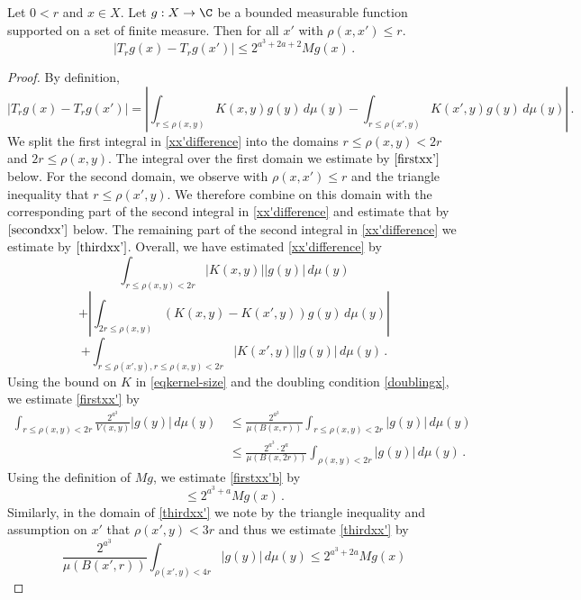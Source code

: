 \begin{lemma}
\label{estimate-x-shift}
\leanok
{}
Let $0<r$ and  $x\in X$. Let $g:X\to\C$ be a bounded measurable function supported on a set of finite measure.
Then for all $x'$ with $\rho(x,x')\le r$.
\begin{equation*}
\left| T_r g(x) - T_r g(x') \right|
\le 2^{a^3 + 2a + 2} Mg(x)\, .
\end{equation*}
\end{lemma}
\begin{proof}
\leanok
By definition,
\begin{equation}
\label{xx'difference}
\left| T_r g(x) - T_r g(x') \right|
=\left|\int_{r\le\rho(x,y)} K(x,y) g(y) \,d\mu(y)
-\int_{r\le\rho(x',y)}
K(x',y) g(y)\, d\mu(y)
\right| \, .
\end{equation}
We split the first integral in \eqref{xx'difference}
into the domains $r\le\rho(x,y)<2r$
and $2r\le\rho(x,y)$. The integral over the first domain we estimate
by $\eqref{firstxx'}$ below.
For the second domain, we
observe with $\rho(x,x')\le r$ and the triangle inequality that $r\le\rho(x',y)$. We therefore combine on this domain with the
corresponding part of the second integral in \eqref{xx'difference} and estimate that by $\eqref{secondxx'}$
below. The remaining part of the second integral in
\eqref{xx'difference} we estimate by $\eqref{thirdxx'}$.
Overall, we have estimated \eqref{xx'difference} by
\begin{equation}
\label{firstxx'}
\int_{r\le\rho(x,y)< 2r} |K(x,y)| |g(y)| \,d\mu(y)
\end{equation}
\begin{equation}
\label{secondxx'}
  +  \left|\int_{2r\le\rho(x,y)} (K(x,y)-K(x',y)) g(y) \,d\mu(y)
\right|
\end{equation}
\begin{equation}
\label{thirdxx'}
  +\int_{r\le\rho(x',y), r\le\rho(x,y)<2r}
|K(x',y)| |g(y)|\, d\mu(y)\,.
\end{equation}
Using the bound on $K$ in \eqref{eqkernel-size} and the doubling condition \eqref{doublingx}, we estimate \eqref{firstxx'} by
\begin{align}
 \int_{r\le\rho(x,y)<2r} \frac{2^{a^3}}{V(x,y)} |g(y)| \,d\mu(y)\,
&\le
\frac{2^{a^3}}{\mu(B(x,r))} \int_{r\le\rho(x,y)<2r}
|g(y)| \, d\mu(y)\, \\
\label{firstxx'b}
&\le
\frac{2^{a^3} \cdot 2^a}{\mu(B(x,2r))} \int_{\rho(x,y)<2r}
|g(y)| \, d\mu(y)\,
.
\end{align}
Using the definition of $Mg$, we estimate
\eqref{firstxx'b} by
\begin{equation}
\label{firstxx'c}
 \le 2^{a^3 + a} {Mg(x)}\, .
\end{equation}
Similarly, in the domain of \eqref{thirdxx'}
we note by the triangle inequality
and assumption on $x'$ that $\rho(x',y)<3r$ and thus we estimate
\eqref{thirdxx'}
by
\begin{equation}
\label{thirdxx'b}
\frac{2^{a^3}}{\mu(B(x',r))} \int_{\rho(x',y)<4r}
|g(y)| \, d\mu(y)\le 2^{a^3 + 2a} Mg(x)
\end{equation}


\end{proof}
